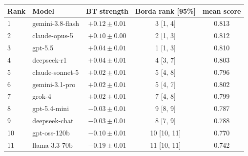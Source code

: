 \begin{tabular}{llccc}
\toprule
Rank & Model & BT strength & Borda rank [95\%] & mean score \\
\midrule
1 & gemini-3.8-flash & $+0.12 \pm 0.01$ & 3 [1, 4] & 0.813 \\
2 & claude-opus-5 & $+0.10 \pm 0.00$ & 2 [1, 3] & 0.812 \\
3 & gpt-5.5 & $+0.04 \pm 0.01$ & 1 [1, 3] & 0.810 \\
4 & deepseek-r1 & $+0.04 \pm 0.01$ & 4 [3, 7] & 0.803 \\
5 & claude-sonnet-5 & $+0.02 \pm 0.01$ & 5 [4, 8] & 0.796 \\
6 & gemini-3.1-pro & $+0.02 \pm 0.01$ & 5 [4, 7] & 0.802 \\
7 & grok-4 & $+0.02 \pm 0.01$ & 7 [4, 8] & 0.799 \\
8 & gpt-5.4-mini & $-0.03 \pm 0.01$ & 9 [8, 9] & 0.787 \\
9 & deepseek-chat & $-0.03 \pm 0.01$ & 8 [7, 9] & 0.788 \\
10 & gpt-oss-120b & $-0.10 \pm 0.01$ & 10 [10, 11] & 0.770 \\
11 & llama-3.3-70b & $-0.19 \pm 0.01$ & 11 [10, 11] & 0.742 \\
\bottomrule
\end{tabular}

